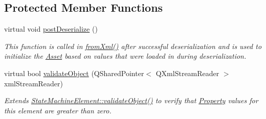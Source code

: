 \subsection*{Protected Member Functions}
\begin{DoxyCompactItemize}
\item 
virtual void \hyperlink{class_picto_1_1_reward_a4c2d4714bba0e99537fa9438b7acc9c0}{post\-Deserialize} ()
\begin{DoxyCompactList}\small\item\em This function is called in \hyperlink{class_picto_1_1_asset_a8bed4da09ecb1c07ce0dab313a9aba67}{from\-Xml()} after successful deserialization and is used to initialize the \hyperlink{class_picto_1_1_asset}{Asset} based on values that were loaded in during deserialization. \end{DoxyCompactList}\item 
\hypertarget{class_picto_1_1_reward_ad88c181f048c98bbc457f2c6b1b49ba3}{virtual bool \hyperlink{class_picto_1_1_reward_ad88c181f048c98bbc457f2c6b1b49ba3}{validate\-Object} (Q\-Shared\-Pointer$<$ Q\-Xml\-Stream\-Reader $>$ xml\-Stream\-Reader)}\label{class_picto_1_1_reward_ad88c181f048c98bbc457f2c6b1b49ba3}

\begin{DoxyCompactList}\small\item\em Extends \hyperlink{class_picto_1_1_state_machine_element_a52a176b16cf803ed3e7f82f3e1a4dfb7}{State\-Machine\-Element\-::validate\-Object()} to verify that \hyperlink{class_picto_1_1_property}{Property} values for this element are greater than zero. \end{DoxyCompactList}\end{DoxyCompactItemize}
